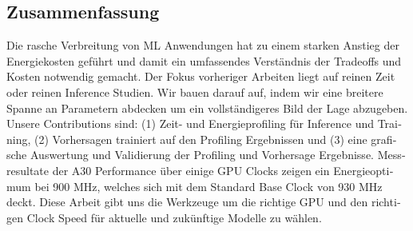\newpage


\begin{otherlanguage}{ngerman}
\chapter*{Zusammenfassung}



Die rasche Verbreitung von ML Anwendungen hat zu einem starken Anstieg der Energiekosten geführt und damit ein umfassendes Verständnis der 
Tradeoffs und Kosten notwendig gemacht. Der Fokus vorheriger Arbeiten liegt auf reinen Zeit oder reinen Inference Studien. Wir bauen darauf auf, indem wir eine breitere Spanne an Parametern abdecken um ein vollständigeres Bild der Lage abzugeben. Unsere Contributions sind: (1) Zeit- und Energieprofiling für Inference und Training, (2) Vorhersagen trainiert auf den Profiling Ergebnissen und (3) eine grafische Auswertung und Validierung der Profiling und Vorhersage Ergebnisse. Messresultate der A30 Performance über einige GPU Clocks zeigen ein Energieoptimum bei 900 MHz, welches sich mit dem Standard Base Clock von 930 MHz deckt. Diese Arbeit gibt uns die Werkzeuge um die richtige GPU und den richtigen Clock Speed für aktuelle und zukünftige Modelle zu wählen.
\end{otherlanguage}

\endgroup

\vfill
